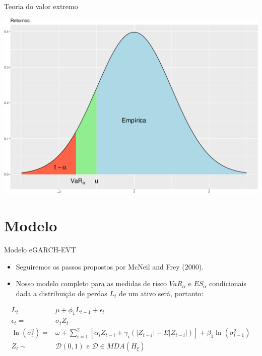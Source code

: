 \documentclass[ignorenonframetext,]{beamer}
\providecommand{\tightlist}{%
\setlength{\itemsep}{0pt}\setlength{\parskip}{0pt}}
\begin{document}
\begin{frame}{Teoria do valor extremo}

\includegraphics{artigo-apresentacao_files/figure-beamer/pot-1.pdf}

\end{frame}

\section{Modelo}\label{modelo}

\begin{frame}{Modelo eGARCH-EVT}

\begin{itemize}
\tightlist
\item
  Seguiremos os passos propostos por McNeil and Frey (2000).
\item
  Nosso modelo completo para as medidas de risco \(VaR_\alpha\) e
  \(ES_\alpha\) condicionais dada a distribuição de perdas \(L_t\) de um
  ativo será, portanto:
\end{itemize}

\begin{align*}
L_t=&\mu+ \phi_1 L_{t-1}+ \epsilon_t \\
\epsilon_t=&\sigma_t Z_t\\
\ln(\sigma_t^2)=&\omega+ \sum_{i=1}^{2}[\alpha_i Z_{t-i}+ \gamma_i(|Z_{t-i}|-E|Z_{t-i}|)]+ \beta_1 \ln(\sigma_{t-1}^2) \\
Z_t\sim &\mathcal{D}(0,1) \text{ e } \mathcal{D} \in MDA(H_\xi)
\end{align*}

\end{frame}
\end{document}
